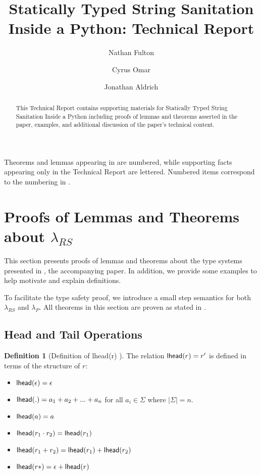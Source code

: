 \documentclass[12pt]{article}
\title{Statically Typed String Sanitation Inside a Python: Technical Report}
\author{Nathan Fulton\and Cyrus Omar\and Jonathan Aldrich}
\theoremstyle{definition}
\newtheorem{defn}[thm]{Definition}
\newcommand{\lambdas}{\lambda_{RS}}
\newcommand{\lambdap}{\lambda_P}
\newcommand{\lhead}[1]{ {\sf lhead}(#1) }
\begin{document}
\linenumbers

\maketitle

\begin{abstract}
This Technical Report contains supporting materials for Statically Typed
String Sanitation Inside a Python \cite{fulton2014} including proofs of lemmas
and theorems asserted in the paper, examples, and additional discussion of
the paper's technical content.
\end{abstract}

Theorems and lemmas appearing in \cite{fulton2014} are numbered, while
supporting facts appearing only in the Technical Report are lettered.
Numbered items correspond to the numbering in \cite{fulton2014}.


\section{Proofs of Lemmas and Theorems about $\lambdas$}

This section presents proofs of lemmas and theorems about the type systems
presented in \cite{fulton2014}, the accompanying paper. In addition, we provide some examples to help 
motivate and explain definitions.

To facilitate the type safety proof, we introduce
a small step semantics for both $\lambdas$ and $\lambdap$. All theorems in
this section are proven as stated in \cite{fulton2014}.

\subsection{Head and Tail Operations}

\begin{defn}[Definition of \lhead{r}]\label{def:lhead}
The relation $\lhead{r}=r'$ is defined in terms of the structure of $r$:
\begin{itemize}[noitemsep]
\item $\lhead{\epsilon} = \epsilon$
\item $\lhead{.} = a_1 + a_2 + ... + a_n$ for all $a_i \in \Sigma$ where $|\Sigma| = n$.
\item $\lhead{a} = a$ %
\item $\lhead{r_1\cdot r_2} = \lhead{r_1}$
\item $\lhead{r_1 +  r_2}  = \lhead{r_1} + \lhead{r_2}$
\item $\lhead{r*} = \epsilon + \lhead{r}$
\end{itemize}
\end{defn}
\end{document}
